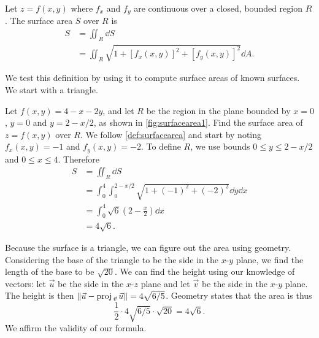 \begin{definition}\label{def:surfacearea}%
Let $z=f(x,y)$ where $f_x$ and $f_y$ are continuous over a closed, bounded region $R$. The surface area $S$ over $R$ is 
\begin{align*}
S &= \iint_R \dd S\\
&=\iint_R \sqrt{1+[f_x(x,y)]^2+[f_y(x,y)]^2}\dd A.
\end{align*}
\end{definition}


We test this definition by using it to compute surface areas of known surfaces. We start with a triangle.

\begin{example}\label{ex_surfacearea1}%
Let $f(x,y) = 4-x-2y$, and let $R$ be the region in the plane bounded by $x=0$, $y=0$ and $y=2-x/2$, as shown in \autoref{fig:surfacearea1}. Find the surface area of $z=f(x,y)$ over $R$.
%
%
\solution
We follow \autoref{def:surfacearea} and start by noting $f_x(x,y) = -1$ and $f_y(x,y) = -2$. To define $R$, we use bounds $0\leq y\leq 2-x/2$ and $0\leq x\leq 4$. Therefore
\begin{align*}
S &= \iint_R\dd S \\
  &= \int_0^4\int_0^{2-x/2} \sqrt{1+(-1)^2+(-2)^2}\dd y\dd x\\
	&= \int_0^4 \sqrt{6}\left(2-\frac x2\right)\dd x\\
	&= 4\sqrt{6}.
\end{align*}

Because the surface is a triangle, we can figure out the area using geometry. Considering the base of the triangle to be the side in the $x$-$y$ plane, we find the length of the base to be $\sqrt{20}$. We can find the height using our knowledge of vectors: let $\vec u$ be the side in the $x$-$z$ plane  and let $\vec v$ be the side in the $x$-$y$ plane. The height is then $\norm {\vec u - \proj{u}{v}} = 4\sqrt{6/5}$. Geometry states that the area is thus
\[\frac 12\cdot4\sqrt{6/5}\cdot\sqrt{20} = 4\sqrt{6}.\]
We affirm the validity of our formula.
\end{example}

